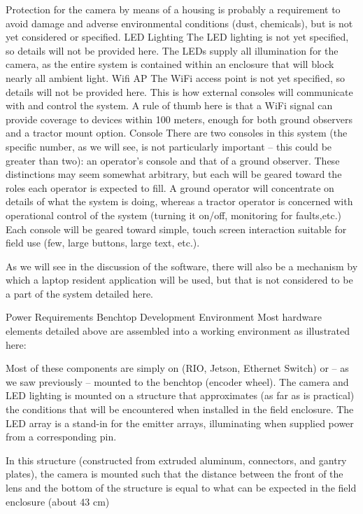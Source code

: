 \documentclass[letterpaper]{article}
\begin{document}
Protection for the camera by means of a housing is probably a requirement to avoid damage and adverse environmental conditions (dust, chemicals), but is not yet considered or specified.
LED Lighting
The LED lighting is not yet specified, so details will not be provided here. The LEDs supply all illumination for the camera, as the entire system is contained within an enclosure that will block nearly all ambient light.
Wifi AP
The WiFi access point is not yet specified, so details will not be provided here. This is how external consoles will communicate with and control the system.  A rule of thumb here is that a WiFi signal can provide coverage to devices within 100 meters, enough for both ground observers and a tractor mount option.
Console
There are two consoles in this system (the specific number, as we will see, is not particularly important -- this could be greater than two): an operator’s console and that of a ground observer.  These distinctions may seem somewhat arbitrary, but each will be geared toward the roles each operator is expected to fill. A ground operator will concentrate on details of what the system is doing, whereas a tractor operator is concerned with operational control of the system (turning it on/off, monitoring for faults,etc.) Each console will be geared toward simple, touch screen interaction suitable for field use (few, large buttons, large text, etc.).

As we will see in the discussion of the software, there will also be a mechanism by which a laptop resident application will be used, but that is not considered to be a part of the system detailed here.

Power Requirements
Benchtop Development Environment
Most hardware elements detailed above are assembled into a working environment as illustrated here:


Most of these components are simply on (RIO, Jetson, Ethernet Switch) or -- as we saw previously --  mounted to the benchtop (encoder wheel).  The camera and LED lighting is mounted on a structure that approximates (as far as is practical) the conditions that will be encountered when installed in the field enclosure. The LED array is a stand-in for the emitter arrays, illuminating when supplied power from a corresponding pin.

In this structure (constructed from extruded aluminum, connectors, and gantry plates), the camera is mounted such that the distance between the front of the lens and the bottom of the structure is equal to what can be expected in the field enclosure (about 43 cm)
\end{document}
